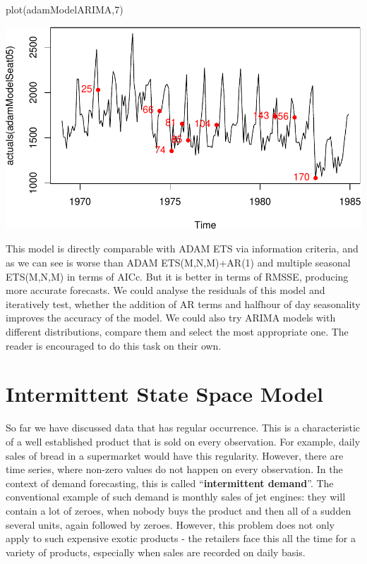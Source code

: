 \documentclass[
]{book}
\newenvironment{Shaded}{\begin{snugshade}}{\end{snugshade}}
\newcommand{\DecValTok}[1]{\textcolor[rgb]{0.00,0.00,0.81}{#1}}
\newcommand{\FunctionTok}[1]{\textcolor[rgb]{0.00,0.00,0.00}{#1}}
\newcommand{\NormalTok}[1]{#1}
\theoremstyle{definition}
\theoremstyle{definition}
\theoremstyle{definition}
\theoremstyle{definition}
\theoremstyle{remark}
\begin{document}
\begin{Shaded}
\begin{Highlighting}[]
\FunctionTok{plot}\NormalTok{(adamModelARIMA,}\DecValTok{7}\NormalTok{)}
\end{Highlighting}
\end{Shaded}

\includegraphics{adam_files/figure-latex/unnamed-chunk-117-1.pdf}

This model is directly comparable with ADAM ETS via information criteria, and as we can see is worse than ADAM ETS(M,N,M)+AR(1) and multiple seasonal ETS(M,N,M) in terms of AICc. But it is better in terms of RMSSE, producing more accurate forecasts. We could analyse the residuals of this model and iteratively test, whether the addition of AR terms and halfhour of day seasonality improves the accuracy of the model. We could also try ARIMA models with different distributions, compare them and select the most appropriate one. The reader is encouraged to do this task on their own.

\hypertarget{ADAMIntermittent}{%
\chapter{Intermittent State Space Model}\label{ADAMIntermittent}}

So far we have discussed data that has regular occurrence. This is a characteristic of a well established product that is sold on every observation. For example, daily sales of bread in a supermarket would have this regularity. However, there are time series, where non-zero values do not happen on every observation. In the context of demand forecasting, this is called ``\textbf{intermittent demand}''. The conventional example of such demand is monthly sales of jet engines: they will contain a lot of zeroes, when nobody buys the product and then all of a sudden several units, again followed by zeroes. However, this problem does not only apply to such expensive exotic products - the retailers face this all the time for a variety of products, especially when sales are recorded on daily basis.
\end{document}

